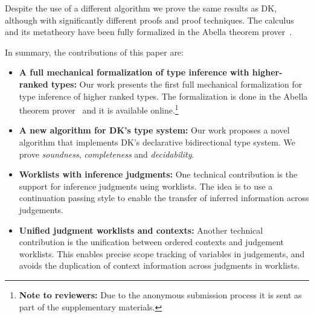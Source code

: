 Despite the use of a different algorithm we prove the
same results as DK, although with significantly different proofs and
proof techniques. The calculus and its metatheory
have been fully formalized in the Abella theorem prover~\cite{AbellaDesc}.

In summary, the contributions of this paper are:

\begin{itemize}

\item {\bf A full mechanical formalization of type inference with
  higher-ranked types:} Our work presents the first full mechanical formalization
  for type inference of higher ranked types. The formalization is done in the
  Abella theorem prover~\cite{AbellaDesc} and it is available
  online.\footnote{{\bf Note to reviewers:} Due to the anonymous submission process
  it is sent as part of the supplementary materials.}

\item {\bf A new algorithm for DK's type system:} Our work proposes a novel algorithm that implements
  DK's declarative bidirectional type system. We prove
  \emph{soundness}, \emph{completeness} and
  \emph{decidability}. 

\item {\bf Worklists with inference judgments:} One technical contribution is the
  support for inference judgments using worklists. The idea is to
  use a continuation passing style to enable the transfer of inferred information across
  judgements. 

\item {\bf Unified judgment worklists and contexts:} Another technical contribution is the unification
  between ordered contexts and judgement worklists. This enables precise scope tracking
  of variables in judgements, and avoids the duplication of context information across
  judgments in worklists.


\end{itemize}
